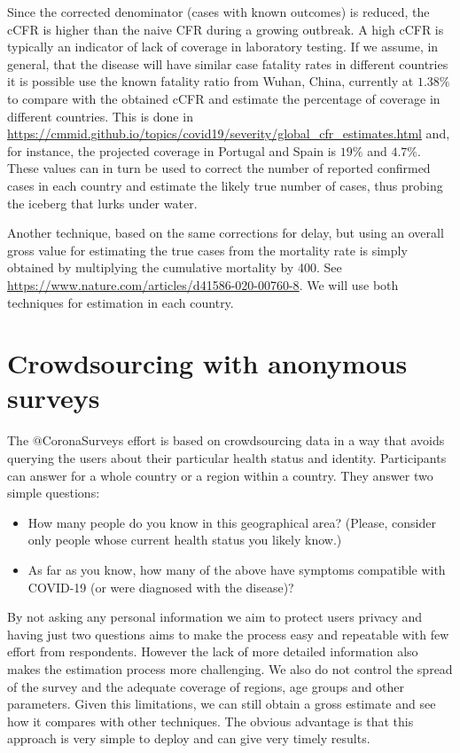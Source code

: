 \documentclass{article}
\begin{document}
Since the corrected denominator (cases with known outcomes) is reduced, the cCFR is higher than the naive CFR during a growing outbreak. A high cCFR is typically an indicator of lack of coverage in laboratory testing. If we assume, in general, that the disease will have similar case fatality rates in different countries it is possible use the known fatality ratio from Wuhan, China, currently at $1.38\%$
to compare with the obtained cCFR and estimate the percentage of coverage in different countries. This is done in \url{https://cmmid.github.io/topics/covid19/severity/global_cfr_estimates.html} and, for instance, the projected coverage in Portugal and Spain is $19\%$ and $4.7\%$. These values can in turn be used to correct the number of reported confirmed cases in each country and estimate the likely true number of cases, thus probing the iceberg that lurks under water.

Another technique, based on the same corrections for delay, but using an overall gross value for estimating the true cases from the mortality rate is simply obtained by multiplying the cumulative mortality by 400. See \url{https://www.nature.com/articles/d41586-020-00760-8}. We will use both techniques for estimation in each country.

\section{Crowdsourcing with anonymous surveys}

The $@$CoronaSurveys effort is based on crowdsourcing data in a way that avoids querying the users about their particular health status and identity. Participants can answer for a whole country or a region within a country. They answer two simple questions: 

\begin{itemize}
\item How many people do you know in this geographical area? (Please, consider only people whose current health status you likely know.)
\item As far as you know, how many of the above have symptoms compatible with COVID-19 (or were diagnosed with the disease)?
\end{itemize}

By not asking any personal information we aim to protect users privacy and having just two questions aims to make the process easy and repeatable with few effort from respondents. However the lack of more detailed information also makes the estimation process more challenging. We also do not control the spread of the survey and the adequate coverage of regions, age groups and other parameters.
Given this limitations, we can still obtain a gross estimate and see how it compares with other techniques. The obvious advantage is that this approach is very simple to deploy and can give very timely results. 
\end{document}
